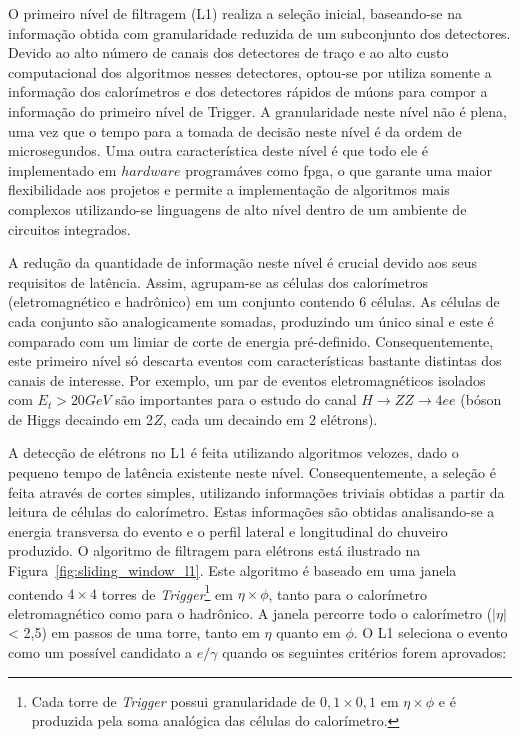 O primeiro nível de filtragem (L1) realiza a seleção inicial, baseando-se na informação obtida com granularidade reduzida de um subconjunto dos detectores.
Devido ao alto número de canais dos detectores de traço e ao alto custo computacional dos algoritmos nesses detectores, optou-se por utiliza somente a 
informação dos calorímetros e dos detectores rápidos de múons para compor a informação do primeiro nível de Trigger.  A granularidade neste nível não é 
plena, uma vez que o tempo para a tomada de decisão neste nível é da ordem de microsegundos. Uma outra característica deste nível é que todo ele é implementado 
em $hardware$ programáves como \gls{fpga}, o que garante uma maior flexibilidade aos projetos e permite a implementação de algoritmos mais complexos 
utilizando-se linguagens de alto nível dentro de um ambiente de circuitos integrados.

A redução da quantidade de informação neste nível é crucial devido aos seus requisitos de latência. Assim, agrupam-se as células dos calorímetros 
(eletromagnético e hadrônico) em um conjunto contendo 6 células. As células de cada conjunto são analogicamente somadas, produzindo um único
sinal e este é comparado com um limiar de corte de energia pré-definido. Consequentemente, este primeiro nível só descarta eventos com características 
bastante distintas dos canais de interesse. Por exemplo, um par de eventos eletromagnéticos isolados com $E_{t} > 20GeV$ são importantes para o estudo
do canal $H \rightarrow ZZ \rightarrow 4ee$ (bóson de Higgs decaindo em 2$Z$, cada um decaindo em 2 elétrons).    

A detecção de elétrons no L1 é feita utilizando algoritmos velozes, dado o pequeno tempo de latência existente neste nível. Consequentemente, a seleção
é feita através de cortes simples, utilizando informações triviais obtidas a partir da leitura de células do calorímetro. Estas informações são obtidas analisando-se
a energia transversa do evento e o perfil lateral e longitudinal do chuveiro produzido.  O algoritmo de filtragem para elétrons está ilustrado na Figura~\ref{fig:sliding_window_l1}. Este algoritmo é baseado em uma janela contendo $4\times4$ torres de \textit{Trigger}\footnote{Cada torre de \textit{Trigger} possui granularidade de $0,1\times0,1$ em $\eta\times\phi$ e é produzida pela soma analógica das células do calorímetro.} em $\eta\times\phi$, tanto para o calorímetro eletromagnético como para o hadrônico. A janela percorre todo o calorímetro ($|\eta|$ < 2,5) em passos de uma torre, tanto em $\eta$ quanto em $\phi$. O L1 seleciona o evento como um possível candidato a $e/\gamma$ quando os seguintes critérios forem aprovados:

